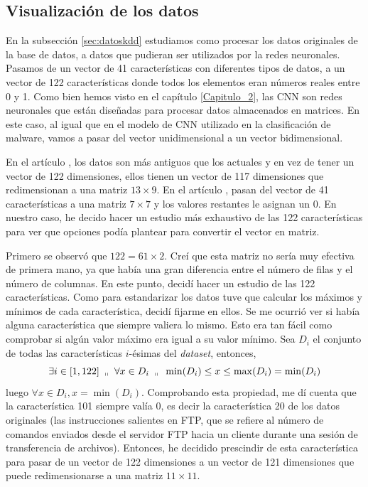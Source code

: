 \subsection{Visualización de los datos}

En la subsección \ref{sec:datoskdd} estudiamos como procesar los datos originales de la base de datos, a datos que pudieran ser utilizados por la redes neuronales. Pasamos de un vector de 41 características con diferentes tipos de datos, a un vector de 122 características donde todos los elementos eran números reales entre 0 y 1. Como bien hemos visto en el capítulo \ref{Capitulo_2}, las CNN son redes neuronales que están diseñadas para procesar datos almacenados en matrices. En este caso, al igual que en el modelo de CNN utilizado en la clasificación de malware, vamos a pasar del vector unidimensional a un vector bidimensional. 

En el artículo \citep{kim2020cnn}, los datos son más antiguos que los actuales y en vez de tener un vector de 122 dimensiones, ellos tienen un vector de 117 dimensiones que redimensionan a una matriz $13 \times 9$. En el artículo \citep{yao2021intrusion}, pasan del vector de 41 características a una matriz $7 \times 7$ y los valores restantes le asignan un 0. En nuestro caso, he decido hacer un estudio más exhaustivo de las 122 características para ver que opciones podía plantear para convertir el vector en matriz.

Primero se observó que $122 = 61 \times 2$. Creí que esta matriz no sería muy efectiva de primera mano, ya que había una gran diferencia entre el número de filas y el número de columnas. En este punto, decidí hacer un estudio de las 122 características. Como para estandarizar los datos tuve que calcular los máximos y mínimos de cada característica, decidí fijarme en ellos. Se me ocurrió ver si había alguna característica que siempre valiera lo mismo. Esto era tan fácil como comprobar si algún valor máximo era igual a su valor mínimo. Sea $D_i$ el conjunto de todas las características $i$-ésimas del \textit{dataset}, entonces, 
\begin{equation}
    \exists i \in [1,122] \hspace{2mm} _{\shortparallel} \hspace{2mm} \forall x \in D_i \hspace{2mm} _{\shortparallel} \hspace{2mm} \min(D_i) \leq x \leq \max(D_i) = \min(D_i)
\end{equation}
luego $\forall x \in D_i, x = \min(D_i)$. Comprobando esta propiedad, me dí cuenta que la característica 101 siempre valía 0, es decir la característica 20 de los datos originales (las instrucciones salientes en FTP, que se refiere al número de comandos enviados desde el servidor FTP hacia un cliente durante una sesión de transferencia de archivos). Entonces, he decidido prescindir de esta característica para pasar de un vector de 122 dimensiones a un vector de 121 dimensiones que puede redimensionarse a una matriz $11 \times 11$. 


